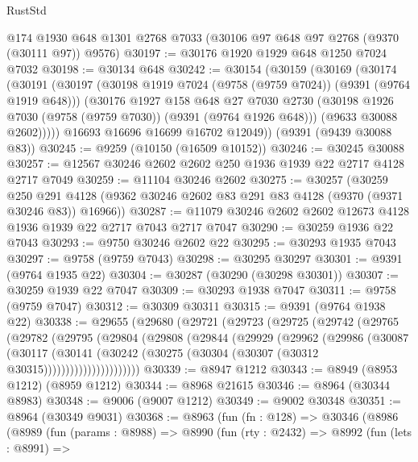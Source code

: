 \begin{lexlean}{RustStd}
\begin{coremodule}
    @174
    @1930
    @648
    @1301
    @2768
    @7033
    (@30106 @97 @648 @97 @2768 (@9370 (@30111 @97)) @9576)
@30197 := @30176 @1920 @1929 @648 @1250 @7024 @7032
@30198 := @30134 @648
@30242 := @30154
    (@30159
      (@30169
        (@30174
          (@30191
            (@30197
              (@30198 @1919 @7024 (@9758 (@9759 @7024)) (@9391 (@9764 @1919 @648)))
              (@30176
                @1927
                @158
                @648
                @27
                @7030
                @2730
                (@30198 @1926 @7030 (@9758 (@9759 @7030)) (@9391 (@9764 @1926 @648)))
                (@9633 @30088 @2602)))))
        @16693
        @16696
        @16699
        @16702
        @12049))
    (@9391 (@9439 @30088 @83))
@30245 := @9259 (@10150 (@16509 @10152))
@30246 := @30245 @30088
@30257 := @12567 @30246 @2602 @2602 @250 @1936 @1939 @22 @2717 @4128 @2717 @7049
@30259 := @11104 @30246 @2602
@30275 := @30257
    (@30259
      @250
      @291
      @4128
      (@9362 @30246 @2602 @83 @291 @83 @4128 (@9370 (@9371 @30246 @83)) @16966))
@30287 := @11079 @30246 @2602 @2602 @12673 @4128 @1936 @1939 @22 @2717 @7043 @2717 @7047
@30290 := @30259 @1936 @22 @7043
@30293 := @9750 @30246 @2602 @22
@30295 := @30293 @1935 @7043
@30297 := @9758 (@9759 @7043)
@30298 := @30295 @30297
@30301 := @9391 (@9764 @1935 @22)
@30304 := @30287 (@30290 (@30298 @30301))
@30307 := @30259 @1939 @22 @7047
@30309 := @30293 @1938 @7047
@30311 := @9758 (@9759 @7047)
@30312 := @30309 @30311
@30315 := @9391 (@9764 @1938 @22)
@30338 := @29655
    (@29680
      (@29721
        (@29723
          (@29725
            (@29742
              (@29765
                (@29782
                  (@29795
                    (@29804
                      (@29808
                        (@29844
                          (@29929
                            (@29962
                              (@29986
                                (@30087
                                  (@30117
                                    (@30141
                                      (@30242
                                        (@30275 (@30304 (@30307 (@30312 @30315))))))))))))))))))))))
@30339 := @8947 @1212
@30343 := @8949 (@8953 @1212) (@8959 @1212)
@30344 := @8968 @21615
@30346 := @8964 (@30344 @8983)
@30348 := @9006 (@9007 @1212)
@30349 := @9002 @30348
@30351 := @8964 (@30349 @9031)
@30368 := @8963
    (fun (fn : @128) =>
    @30346
      (@8986
        (@8989
          (fun (params : @8988) =>
          @8990
            (fun (rty : @2432) =>
            @8992
              (fun (lets : @8991) =>

\end{coremodule}
\end{lexlean}
